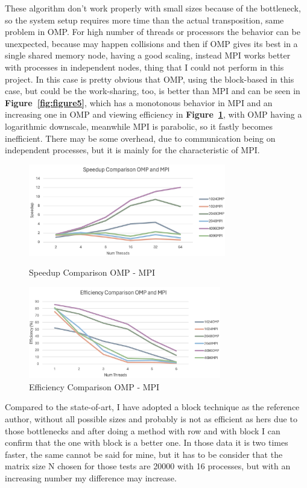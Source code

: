 These algorithm don't work properly with small sizes because of the bottleneck, so the system setup requires more time than the actual transposition, same problem in OMP. For high number of threads or processors the behavior can be unexpected, because may happen collisions and then if OMP gives its best in a single shared memory node, having a good scaling, instead MPI works better with processes in independent nodes, thing that I could not perform in this project. In this case is pretty obvious that OMP, using the block-based in this case, but could be the work-sharing, too, is better than MPI and can be seen in \textbf{Figure~\ref{fig:figure5}}, which has a monotonous behavior in MPI and an increasing one in OMP and viewing efficiency in \textbf{Figure~\ref{fig:figure6}}, with OMP having a logarithmic downscale, meanwhile MPI is parabolic, so it fastly becomes inefficient. There may be some overhead, due to communication being on independent processes, but it is mainly for the characteristic of MPI.
\begin{figure}[h!]
    \centering
    \begin{minipage}[b]{1.0\columnwidth}
        \centering
        \includegraphics[width=\textwidth,height=4cm,keepaspectratio=false]{images/1.09 Speedup Comparison OMP - MPI.png}
        \caption{Speedup Comparison OMP - MPI}
        \label{fig:figure5}
    \end{minipage}
    \hfill
    \begin{minipage}[b]{1.0\columnwidth}
        \centering
        \includegraphics[width=\textwidth,height=4cm,keepaspectratio=false]{images/1.10 Efficiency Comparison OMP - MPI.png}
        \caption{Efficiency Comparison OMP - MPI}
        \label{fig:figure6}
    \end{minipage}
\end{figure}
Compared to the state-of-art, I have adopted a block technique as the reference author, without all possible sizes and probably is not as efficient as hers due to those bottlenecks and after doing a method with row and with block I can confirm that the one with block is a better one. In those data it is two times faster, the same cannot be said for mine, but it has to be consider that the matrix size N chosen for those tests are 20000 with 16 processes, but with an increasing number my difference may increase.
